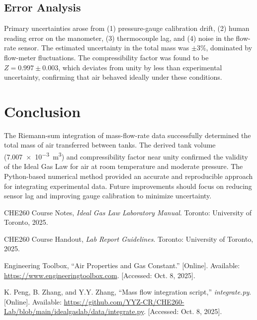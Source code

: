 \documentclass[12pt]{article}
\begin{document}
\subsection*{Error Analysis}
Primary uncertainties arose from (1) pressure-gauge calibration drift, (2) human reading error on the manometer, (3) thermocouple lag, and (4) noise in the flow-rate sensor.  
The estimated uncertainty in the total mass was \(\pm 3\%\), dominated by flow-meter fluctuations.  
The compressibility factor was found to be \(Z = 0.997 \pm 0.003\), which deviates from unity by less than experimental uncertainty, confirming that air behaved ideally under these conditions.


\section*{Conclusion}
The Riemann-sum integration of mass-flow-rate data successfully determined the total mass of air transferred between tanks. The derived tank volume (\SI{7.007e-3}{\metre\cubed}) and compressibility factor near unity confirmed the validity of the Ideal Gas Law for air at room temperature and moderate pressure. The Python-based numerical method provided an accurate and reproducible approach for integrating experimental data. Future improvements should focus on reducing sensor lag and improving gauge calibration to minimize uncertainty.

\begin{thebibliography}{9}
CHE260 Course Notes, \textit{Ideal Gas Law Laboratory Manual}. Toronto: University of Toronto, 2025.

CHE260 Course Handout, \textit{Lab Report Guidelines}. Toronto: University of Toronto, 2025.

Engineering Toolbox, ``Air Properties and Gas Constant.'' [Online]. Available: \url{https://www.engineeringtoolbox.com}. [Accessed: Oct. 8, 2025].

K. Peng, B. Zhang, and Y.Y. Zhang, ``Mass flow integration script,'' \textit{integrate.py}. [Online]. Available: \url{https://github.com/YYZ-CR/CHE260-Lab/blob/main/idealgaslab/data/integrate.py}. [Accessed: Oct. 8, 2025].
\end{thebibliography}
\end{document}
